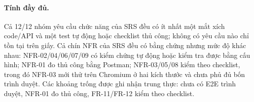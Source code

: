 \paragraph{Tính đầy đủ.}
Cả 12/12 nhóm yêu cầu chức năng của SRS đều có ít nhất một mắt xích code/API và một test tự động hoặc checklist
thủ công; không có yêu cầu nào chỉ tồn tại trên giấy. Cả chín NFR của SRS đều có bằng chứng nhưng mức độ
khác nhau: NFR-02/04/06/07/09 có kiểm chứng tự động hoặc kiểm tra được bằng cấu hình; NFR-01 đo
thủ công bằng Postman; NFR-03/05/08 kiểm theo checklist, trong đó NFR-03 mới thử trên Chromium ở
hai kích thước và chưa phủ đủ bốn trình duyệt. Các khoảng trống được ghi nhận trung thực: chưa có
E2E trình duyệt, NFR-01 đo thủ công, FR-11/FR-12 kiểm theo checklist.
